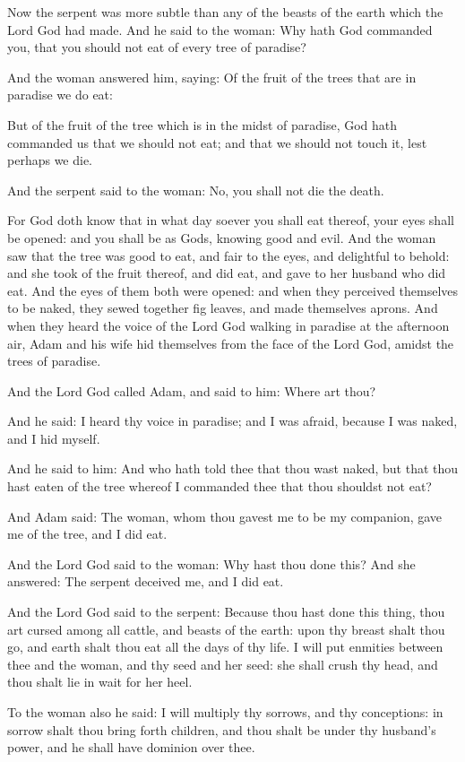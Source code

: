 \begin{multicols}{2}\small
Now the serpent was more subtle than any of the beasts of the earth which the Lord God had made. And he said to the
woman: Why hath God commanded you, that you should not eat of every tree of paradise?

And the woman answered him, saying: Of the fruit of the trees that are in paradise we do eat:

But of the fruit of the tree which is in the midst of paradise, God hath commanded us that we should not eat; and that
we should not touch it, lest perhaps we die.

And the serpent said to the woman: No, you shall not die the death.

For God doth know that in what day soever you shall eat thereof, your eyes shall be opened: and you shall be as Gods,
knowing good and evil. And the woman saw that the tree was good to eat, and fair to the eyes, and delightful to behold:
and she took of the fruit thereof, and did eat, and gave to her husband who did eat. And the eyes of them both were
opened: and when they perceived themselves to be naked, they sewed together fig leaves, and made themselves aprons. And
when they heard the voice of the Lord God walking in paradise at the afternoon air, Adam and his wife hid themselves
from the face of the Lord God, amidst the trees of paradise.

And the Lord God called Adam, and said to him: Where art thou?

And he said: I heard thy voice in paradise; and I was afraid, because I was naked, and I hid myself.

And he said to him: And who hath told thee that thou wast naked, but that thou hast eaten of the tree whereof I
commanded thee that thou shouldst not eat?

And Adam said: The woman, whom thou gavest me to be my companion, gave me of the tree, and I did eat.

And the Lord God said to the woman: Why hast thou done this? And she answered: The serpent deceived me, and I did eat.

And the Lord God said to the serpent: Because thou hast done this thing, thou art cursed among all cattle, and beasts of
the earth: upon thy breast shalt thou go, and earth shalt thou eat all the days of thy life. I will put enmities
between thee and the woman, and thy seed and her seed: she shall crush thy head, and thou shalt lie in wait for her
heel.

To the woman also he said: I will multiply thy sorrows, and thy conceptions: in sorrow shalt thou bring forth children,
and thou shalt be under thy husband's power, and he shall have dominion over thee.


\end{multicols}
